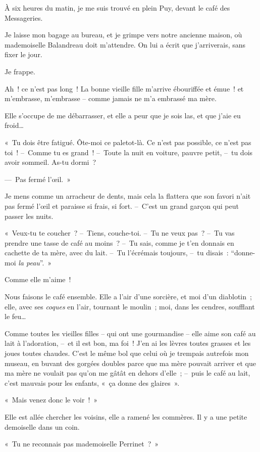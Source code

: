 \documentclass[french,twoside]{book} %
\begin{document}
À six heures du matin, je me suis trouvé en plein Puy, devant le café des Messageries.\par
Je laisse mon bagage au bureau, et je grimpe vers notre ancienne maison, où mademoiselle Balandreau doit m’attendre. On lui a écrit que j’arriverais, sans fixer le jour.\par
Je frappe.\par
Ah ! ce n’est pas long ! La bonne vieille fille m’arrive ébouriffée et émue ! et m’embrasse, m’embrasse – comme jamais ne m’a embrassé ma mère.\par
Elle s’occupe de me débarrasser, et elle a peur que je sois las, et que j’aie eu froid…\par
« Tu dois être fatigué. Ôte-moi ce paletot-là. Ce n’est pas possible, ce n’est pas toi ! – Comme tu es grand ! – Toute la nuit en voiture, pauvre petit, – tu dois avoir sommeil. As-tu dormi ?\par
— Pas fermé l’œil. »\par
Je mens comme un arracheur de dents, mais cela la flattera que son favori n’ait pas fermé l’œil et paraisse si frais, si fort. – C’est un grand garçon qui peut passer les nuits.\par
« Veux-tu te coucher ? – Tiens, couche-toi. – Tu ne veux pas ? – Tu vas prendre une tasse de café au moins ? – Tu sais, comme je t’en donnais en cachette de ta mère, avec du lait. – Tu l’écrémais toujours, – tu disais : “donne-moi \emph{la peau}”. »\par
Comme elle m’aime !\par
Nous faisons le café ensemble. Elle a l’air d’une sorcière, et moi d’un diablotin ; elle, avec ses \emph{coques} en l’air, tournant le moulin ; moi, dans les cendres, soufflant le feu…\par
Comme toutes les vieilles filles – qui ont une gourmandise – elle aime son café au lait à l’adoration, – et il est bon, ma foi ! J’en ai les lèvres toutes grasses et les joues toutes chaudes. C’est le même bol que celui où je trempais autrefois mon museau, en buvant des gorgées doubles parce que ma mère pouvait arriver et que ma mère ne voulait pas qu’on me gâtât en dehors d’elle ; – puis le café au lait, c’est mauvais pour les enfants, « ça donne des glaires ».\par
\bigbreak
\noindent « Mais venez donc le voir ! »\par
Elle est allée chercher les voisins, elle a ramené les commères. Il y a une petite demoiselle dans un coin.\par
« Tu ne reconnais pas mademoiselle Perrinet ? »\par
\end{document}
